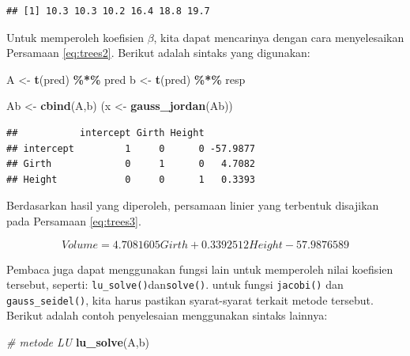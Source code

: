 \documentclass[
]{book}
\newenvironment{Shaded}{\begin{snugshade}}{\end{snugshade}}
\newcommand{\CommentTok}[1]{\textcolor[rgb]{0.56,0.35,0.01}{\textit{#1}}}
\newcommand{\FunctionTok}[1]{\textcolor[rgb]{0.13,0.29,0.53}{\textbf{#1}}}
\newcommand{\NormalTok}[1]{#1}
\newcommand{\OtherTok}[1]{\textcolor[rgb]{0.56,0.35,0.01}{#1}}
\newcommand{\SpecialCharTok}[1]{\textcolor[rgb]{0.81,0.36,0.00}{\textbf{#1}}}
\theoremstyle{definition}
\theoremstyle{definition}
\theoremstyle{definition}
\theoremstyle{definition}
\theoremstyle{remark}
\begin{document}
\begin{Shaded}
\end{Shaded}

\begin{verbatim}
## [1] 10.3 10.3 10.2 16.4 18.8 19.7
\end{verbatim}

Untuk memperoleh koefisien \(\beta\), kita dapat mencarinya dengan cara menyelesaikan Persamaan \eqref{eq:trees2}. Berikut adalah sintaks yang digunakan:

\begin{Shaded}
\begin{Highlighting}[]
\NormalTok{A }\OtherTok{\textless{}{-}} \FunctionTok{t}\NormalTok{(pred) }\SpecialCharTok{\%*\%}\NormalTok{ pred}
\NormalTok{b }\OtherTok{\textless{}{-}} \FunctionTok{t}\NormalTok{(pred) }\SpecialCharTok{\%*\%}\NormalTok{ resp}

\NormalTok{Ab }\OtherTok{\textless{}{-}} \FunctionTok{cbind}\NormalTok{(A,b)}
\NormalTok{(x }\OtherTok{\textless{}{-}} \FunctionTok{gauss\_jordan}\NormalTok{(Ab))}
\end{Highlighting}
\end{Shaded}

\begin{verbatim}
##           intercept Girth Height         
## intercept         1     0      0 -57.9877
## Girth             0     1      0   4.7082
## Height            0     0      1   0.3393
\end{verbatim}

Berdasarkan hasil yang diperoleh, persamaan linier yang terbentuk disajikan pada Persamaan \eqref{eq:trees3}.

\begin{equation}
Volume=4.7081605 Girth + 0.3392512 Height  -57.9876589
 \label{eq:trees3}
\end{equation}

Pembaca juga dapat menggunakan fungsi lain untuk memperoleh nilai koefisien tersebut, seperti: \texttt{lu\_solve()}dan\texttt{solve()}. untuk fungsi \texttt{jacobi()} dan \texttt{gauss\_seidel()}, kita harus pastikan syarat-syarat terkait metode tersebut. Berikut adalah contoh penyelesaian menggunakan sintaks lainnya:

\begin{Shaded}
\begin{Highlighting}[]
\CommentTok{\# metode LU}
\FunctionTok{lu\_solve}\NormalTok{(A,b)}
\end{Highlighting}
\end{Shaded}
\end{document}
